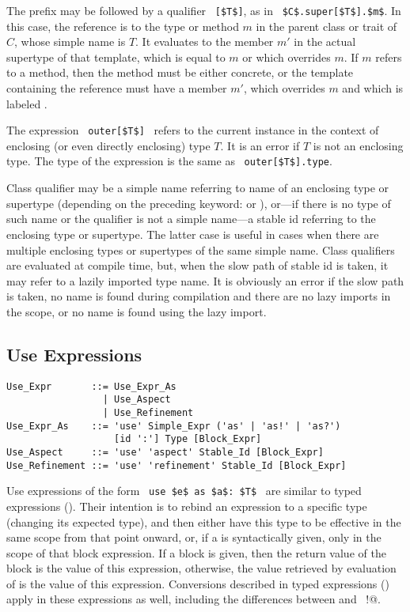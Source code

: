 The  prefix may be followed by a qualifier ~\lstinline![$T$]!, as in ~\lstinline!$C$.super[$T$].$m$!. In this case, the reference is to the type or method $m$ in the parent class or trait of $C$, whose simple name is $T$. It evaluates to the member $m'$ in the actual supertype of that template, which is equal to $m$ or which overrides $m$. If $m$ refers to a method, then the method must be either concrete, or the template containing the reference must have a member $m'$, which overrides $m$ and which is labeled . 

The expression ~\lstinline!outer[$T$]!~ refers to the current instance in the context of enclosing (or even directly enclosing) type $T$. It is an error if $T$ is not an enclosing type. The type of the expression is the same as ~\lstinline!outer[$T$].type!. 

Class qualifier may be a simple name referring to name of an enclosing type or supertype (depending on the preceding keyword:  or ), or---if there is no type of such name or the qualifier is not a simple name---a stable id referring to the enclosing type or supertype. The latter case is useful in cases when there are multiple enclosing types or supertypes of the same simple name. Class qualifiers are evaluated at compile time, but, when the slow path of stable id is taken, it may refer to a lazily imported type name. It is obviously an error if the slow path is taken, no name is found during compilation and there are no lazy imports in the scope, or no name is found using the lazy import. 





\subsection{Use Expressions}
\label{sec:use-expressions}

\syntax\begin{lstlisting}
Use_Expr       ::= Use_Expr_As 
                 | Use_Aspect
                 | Use_Refinement
Use_Expr_As    ::= 'use' Simple_Expr ('as' | 'as!' | 'as?')
                   [id ':'] Type [Block_Expr]
Use_Aspect     ::= 'use' 'aspect' Stable_Id [Block_Expr]
Use_Refinement ::= 'use' 'refinement' Stable_Id [Block_Expr]
\end{lstlisting}

Use expressions of the form ~\lstinline!use $e$ as $a$: $T$!~ are similar to typed expressions (). Their intention is to rebind an expression to a specific type (changing its expected type), and then either have this type to be effective in the same scope from that point onward, or, if a  is syntactically given, only in the scope of that block expression. If a block is given, then the return value of the block is the value of this expression, otherwise, the value retrieved by evaluation of  is the value of this expression. Conversions described in typed expressions () apply in these expressions as well, including the differences between  and ~\lstinline@as!@. 


